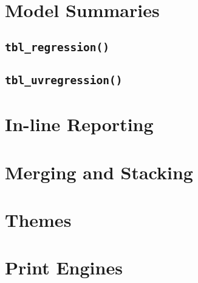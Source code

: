 \section{Model Summaries}

\subsection{\texorpdfstring{\texttt{tbl\_regression()}}{tbl\_regression()}}

\hypertarget{tbl_uvregression}{%
\subsection{\texorpdfstring{\texttt{tbl\_uvregression()}}{tbl\_uvregression()}}\label{tbl_uvregression}}

\hypertarget{in-line-reporting}{%
\section{In-line Reporting}\label{in-line-reporting}}

\hypertarget{merging-and-stacking}{%
\section{Merging and Stacking}\label{merging-and-stacking}}

\hypertarget{themes}{%
\section{Themes}\label{themes}}

\hypertarget{print-engines}{%
\section{Print Engines}\label{print-engines}}



\address{Author One\\
  Affiliation\\
  Address\\
  Country\\
  (ORCiD if desired)\\
  }

\address{Author Two\\
  Affiliation\\
  Address\\
  Country\\
  (ORCiD if desired)\\
  }

\address{Author Three\\
  Affiliation\\
  Address\\
  Country\\
  (ORCiD if desired)\\
  }
